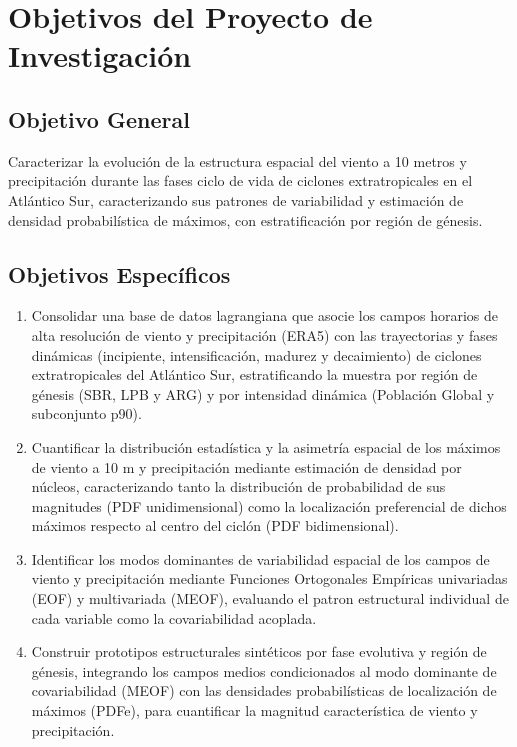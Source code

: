 \section{Objetivos del Proyecto de Investigación}

\subsection{Objetivo General}
Caracterizar la evolución de la estructura espacial del viento a 10 metros y precipitación durante las fases ciclo de vida de ciclones extratropicales en el Atlántico Sur, caracterizando sus patrones de variabilidad y estimación de densidad probabilística de máximos, con estratificación por región de génesis.

\subsection{Objetivos Específicos}
\begin{enumerate}
    \item Consolidar una base de datos lagrangiana que asocie los campos horarios de alta resolución de viento y precipitación (ERA5) con las trayectorias y fases dinámicas (incipiente, intensificación, madurez y decaimiento) de ciclones extratropicales del Atlántico Sur, estratificando la muestra por región de génesis (SBR, LPB y ARG) y por intensidad dinámica (Población Global y subconjunto p90).
    \item Cuantificar la distribución estadística y la asimetría espacial de los máximos de viento a 10 m y precipitación mediante estimación de densidad por núcleos, caracterizando tanto la distribución de probabilidad de sus magnitudes (PDF unidimensional) como la localización preferencial de dichos máximos respecto al centro del ciclón (PDF bidimensional).
    \item Identificar los modos dominantes de variabilidad espacial de los campos de viento y precipitación mediante Funciones Ortogonales Empíricas univariadas (EOF) y multivariada (MEOF), evaluando el patron estructural individual de cada variable como la covariabilidad acoplada.
    \item Construir prototipos estructurales sintéticos por fase evolutiva y región de génesis, integrando los campos medios condicionados al modo dominante de covariabilidad (MEOF) con las densidades probabilísticas de localización de máximos (PDFe), para cuantificar la magnitud característica de viento y precipitación.    
\end{enumerate}